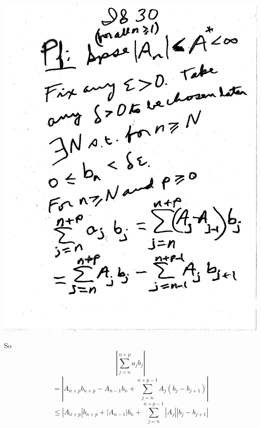 \documentclass[10pt,a4paper]{article}
\begin{document}
{{\includegraphics[scale=.5]{Pages/IS_30}

\newpage

\noindent So
$$|\sum_{j=n}^{n+p} a_j b_j|$$
$$ = |A_{n+p} b_{n+p} - A_{n-1} b_n + \sum_{j=n}^{n+p-1} A_j(b_j - b_{j+1})|$$
$$ \leq |A_{n+p}| b_{n+p} + |A_{n-1}| b_n + \sum_{j=n}^{n+p-1} |A_j| |b_j - b_{j+1}|$$

}}
\end{document}
